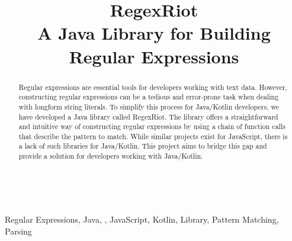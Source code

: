 \documentclass[conference]{IEEEtran}
\begin{document}
\title{RegexRiot \\A Java Library for Building Regular Expressions}\\

\author{
    \and
    \and

}


\maketitle

\begin{abstract}
    Regular expressions are essential tools for developers working with text data.
    However, constructing regular expressions can be a tedious and error-prone task when dealing with longform string literals.
    To simplify this process for Java/Kotlin developers, we have developed a Java library called RegexRiot.
    The library offers a straightforward and intuitive way of constructing regular expressions by using a chain of
    function calls that describe the pattern to match.
    While similar projects exist for JavaScript, there is a lack of such libraries for Java/Kotlin.
    This project aims to bridge this gap and provide a solution for developers working with Java/Kotlin.
\end{abstract}

\begin{IEEEkeywords}
    Regular Expressions, Java, , JavaScript, Kotlin, Library, Pattern Matching, Parsing
\end{IEEEkeywords}
\end{document}
